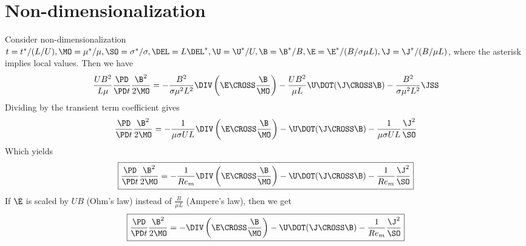 \documentclass[11pt]{article}
\begin{document}
\section{Non-dimensionalization}
Consider non-dimensionalization $t=t^*/(L/U), \MO = \mu^*/\mu, \SO = \sigma^*/\sigma, \DEL = L \DEL^*, \U = \U^*/U, \B = \B^*/B, \E = \E^* / (B/ \sigma \mu L), \J = \J^* / (B/\mu L)$, where the asterisk implies local values. Then we have
\begin{equation}
	\frac{UB^2}{L \mu}
	\frac{\PD }{\PD t} \frac{\B^2}{2 \MO}
	=
	- \frac{B^2}{\sigma \mu^2 L^2} \DIV \left(\E \CROSS \frac{\B}{\MO} \right)
	- \frac{U B^2}{\mu L} \U \DOT (\J \CROSS \B)
	- \frac{B^2}{\sigma \mu^2 L^2} \JSS
\end{equation}
Dividing by the transient term coefficient gives
\begin{equation}
	\frac{\PD }{\PD t} \frac{\B^2}{2 \MO}
	=
	- \frac{1}{\mu \sigma U L} \DIV \left(\E \CROSS \frac{\B}{\MO} \right)
	- \U \DOT (\J \CROSS \B)
	- \frac{1}{\mu \sigma U L} \frac{\J^2}{\SO}
\end{equation}
Which yields
\begin{equation} \label{eq:nrg}
	\boxed{
	\frac{\PD }{\PD t} \frac{\B^2}{2 \MO}
	=
	- \frac{1}{Re_m} \DIV \left(\E \CROSS \frac{\B}{\MO} \right)
	- \U \DOT (\J \CROSS \B)
	- \frac{1}{Re_m} \frac{\J^2}{\SO}
	}
\end{equation}
If $\E$ is scaled by $UB$ (Ohm's law) instead of $\frac{B}{\mu L}$ (Ampere's law), then we get
\begin{equation}
	\boxed{
	\frac{\PD }{\PD t} \frac{\B^2}{2 \MO}
	=
	- \DIV \left(\E \CROSS \frac{\B}{\MO} \right)
	- \U \DOT (\J \CROSS \B)
	- \frac{1}{Re_m} \frac{\J^2}{\SO}
	}
\end{equation}
\end{document}
